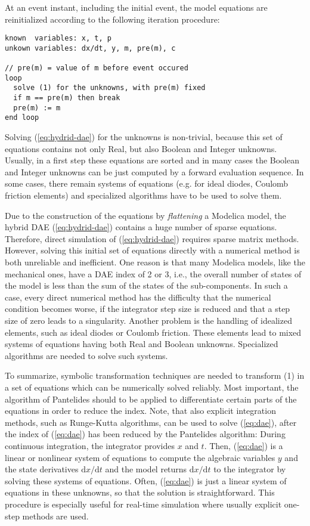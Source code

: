 At an event instant, including the initial event, the model equations
are reinitialized according to the following iteration procedure:
\begin{lstlisting}[language=modelica]
known  variables: x, t, p
unkown variables: dx/dt, y, m, pre(m), c

// pre(m) = value of m before event occured
loop
  solve (1) for the unknowns, with pre(m) fixed
  if m == pre(m) then break
  pre(m) := m
end loop
\end{lstlisting}
Solving (\ref{eq:hydrid-dae}) for the unknowns is non-trivial, because this set of
equations contains not only Real, but also Boolean and Integer unknowns.
Usually, in a first step these equations are sorted and in many cases
the Boolean and Integer unknowns can be just computed by a forward
evaluation sequence. In some cases, there remain systems of equations
(e.g. for ideal diodes, Coulomb friction elements) and specialized
algorithms have to be used to solve them.

Due to the construction of the equations by \emph{flattening} a Modelica
model, the hybrid DAE (\ref{eq:hydrid-dae}) contains a huge number of sparse equations.
Therefore, direct simulation of (\ref{eq:hydrid-dae}) requires sparse matrix methods.
However, solving this initial set of equations directly with a numerical
method is both unreliable and inefficient. One reason is that many
Modelica models, like the mechanical ones, have a DAE index of 2 or 3,
i.e., the overall number of states of the model is less than the sum of
the states of the sub-components. In such a case, every direct numerical
method has the difficulty that the numerical condition becomes worse, if
the integrator step size is reduced and that a step size of zero leads
to a singularity. Another problem is the handling of idealized elements,
such as ideal diodes or Coulomb friction. These elements lead to mixed
systems of equations having both Real and Boolean unknowns. Specialized
algorithms are needed to solve such systems.

To summarize, symbolic transformation techniques are needed to transform
(1) in a set of equations which can be numerically solved reliably. Most
important, the algorithm of Pantelides should to be applied to
differentiate certain parts of the equations in order to reduce the
index. Note, that also explicit integration methods, such as Runge-Kutta
algorithms, can be used to solve (\ref{eq:dae}), after the index of (\ref{eq:dae}) has been
reduced by the Pantelides algorithm: During continuous integration, the
integrator provides $x$ and $t$. Then, (\ref{eq:dae}) is a linear or nonlinear system
of equations to compute the algebraic variables $y$ and the state
derivatives $\mathrm{d}x/\mathrm{d}t$ and the model returns $\mathrm{d}x/\mathrm{d}t$ to the integrator by
solving these systems of equations. Often, (\ref{eq:dae}) is just a linear system
of equations in these unknowns, so that the solution is straightforward.
This procedure is especially useful for real-time simulation where
usually explicit one-step methods are used.

